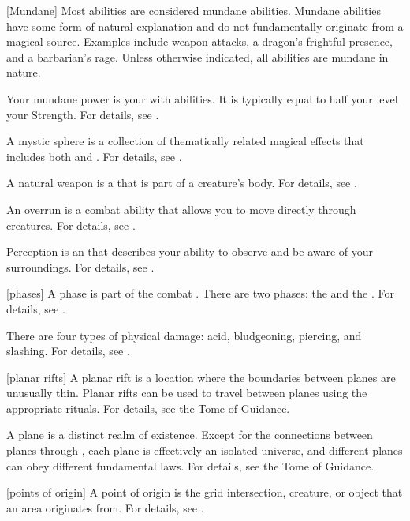 [Mundane] Most abilities are considered mundane abilities.
Mundane abilities have some form of natural explanation and do not fundamentally originate from a magical source.
Examples include weapon attacks, a dragon's frightful presence, and a barbarian's rage.
Unless otherwise indicated, all abilities are mundane in nature.

 Your mundane power is your  with  abilities.
It is typically equal to half your level \add your Strength.
For details, see .

 A mystic sphere is a collection of thematically related magical effects that includes both  and .
For details, see .

 A natural weapon is a  that is part of a creature's body.
For details, see .

 An overrun is a combat ability that allows you to move directly through creatures.
For details, see .

 Perception is an  that describes your ability to observe and be aware of your surroundings.
For details, see .

[phases] A phase is part of the combat .
There are two phases: the  and the .
For details, see .

 There are four types of physical damage: acid, bludgeoning, piercing, and slashing.
For details, see .

[planar rifts] A planar rift is a location where the boundaries between planes are unusually thin.
Planar rifts can be used to travel between planes using the appropriate rituals.
For details, see the Tome of Guidance.

 A plane is a distinct realm of existence.
Except for the connections between planes through , each plane is effectively an isolated universe, and different planes can obey different fundamental laws.
For details, see the Tome of Guidance.

[points of origin] A point of origin is the grid intersection, creature, or object that an area originates from.
For details, see .

